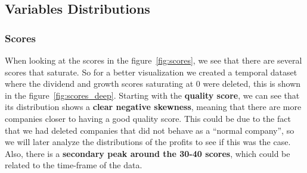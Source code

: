 \documentclass[11pt,english,a4paper,hidelinks]{book}
\begin{document}
\subsection{Variables Distributions}

\subsubsection{Scores}
 When looking at the scores in the figure~\ref{fig:scores}, we see that there are several scores that saturate. So for a better visualization we created a temporal dataset where the dividend and growth scores saturating at 0 were deleted, this is shown in the figure~\ref{fig:scores_deep}. Starting with the \textbf{quality score}, we can see that its distribution shows a \textbf{clear negative skewness}, meaning that there are more companies closer to having a good quality score. This could be due to the fact that we had deleted companies that did not behave as a ``normal company'', so we will later analyze the distributions of the profits to see if this was the case. Also, there is a \textbf{secondary peak around the 30-40 scores}, which could be related to the time-frame of the data. 
\end{document}
